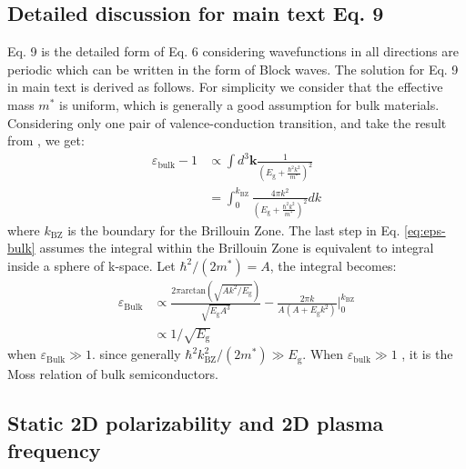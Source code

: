\documentclass[manuscript=suppinfo,email=true,hyperref=true,keywords=false]{achemso}
\begin{document}
\subsection{Detailed discussion for main text Eq. 9}
\label{sec:theory-2}

Eq. 9 is the detailed form of Eq. 6 considering wavefunctions in all
directions are periodic which can be written in the form of Block
waves. The solution for Eq. 9 in main text is derived as follows. For
simplicity we consider that the effective mass $m^{*}$ is uniform,
which is generally a good assumption for bulk materials. Considering
only one pair of valence-conduction transition, and take the result
from \cite{Jiang_2017_Eg_Eb}, we get:
\begin{equation}
  \begin{aligned}
    \label{eq:eps-bulk}
    \varepsilon_{\mathrm{bulk}} - 1 &\propto \int d^{3}\mathbf{k}
    {\displaystyle \frac{1}{(E_{\mathrm{g}} + {\displaystyle
          \frac{\hbar^{2} k^{2}}{m^{*}}})^{2}}}\\
    &= \int_{0}^{k_{\mathrm{BZ}}} {\displaystyle
      \frac{4 \pi k^{2}}{(E_{\mathrm{g}} + {\displaystyle \frac{\hbar^{2}
            k^{2}}{m^{*}}})^{2}}} dk
  \end{aligned}
\end{equation}
where $k_{\mathrm{BZ}}$ is the boundary for the Brillouin Zone. The
last step in Eq. \ref{eq:eps-bulk} assumes the integral within the
Brillouin Zone is equivalent to integral inside a sphere of
k-space. Let $\hbar^{2}/(2 m^{*})=A$, the integral becomes:
\begin{equation}
  \begin{aligned}
    \label{eq:integral-BZ-bulk}
    \varepsilon_{\mathrm{Bulk}} &\propto {\displaystyle \frac{2 \pi
        \mathrm{arctan}(\sqrt{Ak^{2}/E_{\mathrm{g}}})}{\sqrt{E_{\mathrm{g}}A^{3}}}
        - \frac{2\pi k}{A(A+E_{\mathrm{g}}k^{2})}
      } \bigg\rvert_{0}^{k_{\mathrm{BZ}}}\\
      &\propto 1/\sqrt{E_{\mathrm{g}}}
  \end{aligned}
\end{equation}
when $\varepsilon_{\mathrm{Bulk}} \gg 1$. since generally
$\hbar^{2}k_{\mathrm{BZ}}^{2}/(2m^{*}) \gg E_{\mathrm{g}}$. When
$\varepsilon_{\mathrm{bulk}} \gg 1$ \cite{Finkenrath_1988}, it is the
Moss relation of bulk semiconductors.

\subsection{Static 2D polarizability and 2D plasma frequency}
\label{sec:omega-p}
\end{document}

